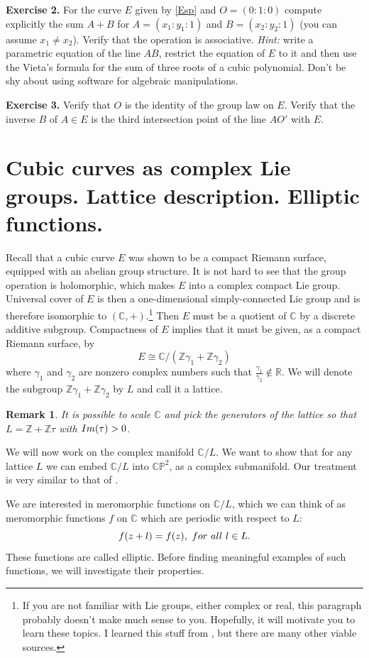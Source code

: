 \documentclass[11pt]{article}
\numberwithin{equation}{section}
\numberwithin{footnote}{section}
\newtheorem{rem}[thm]{Remark}
\newcommand{\blue}{\color{blue}}
\renewcommand{\P}{{\mathbb P}}
\newcommand{\R}{{\mathbb R}}
\newcommand{\Z}{{\mathbb Z}}
\newcommand{\C}{{\mathbb C}}
\begin{document}
{\bf Exercise 2.} For the curve $E$ given by \eqref{Esp} and $O=(0:1:0)$ compute explicitly the sum $A+B$ for $A=(x_1:y_1:1)$ and $B=(x_2:y_2:1)$ (you can assume $x_1\neq x_2$). Verify that the operation is associative.
\emph{Hint:} write a parametric equation of the line $AB$, restrict the equation of $E$ to it and then use the Vieta's formula for the sum of three roots of a cubic polynomial.  Don't be shy about using software for algebraic manipulations.

{\bf Exercise 3.} Verify that $O$ is the identity of the group law on $E$. Verify that the inverse $B$ of $A\in E$ is the third intersection point of the line $AO'$ with $E$.


\section{Cubic curves as complex Lie groups. Lattice description. Elliptic functions.}
Recall that a cubic curve $E$ was shown to be a compact Riemann surface, equipped with an abelian group structure. It is not hard to see that the group operation is holomorphic, which makes $E$ into a complex compact Lie group. Universal cover of $E$ is then a one-dimensional simply-connected Lie group and is therefore isomorphic to $(\C,+)$.\footnote{ If you are not familiar with Lie groups, either complex or real, this paragraph probably doesn't make much sense to you. Hopefully, it will motivate you to learn these topics.
I learned this stuff from \cite{VO}, but there are many other viable sources.} Then $E$ must be a quotient of $\C$ by a discrete additive subgroup. Compactness of $E$ implies that it must be given, {\blue as a compact Riemann surface}, by
$$
E\cong \C/(\Z\gamma_1 + \Z\gamma_2)
$$
where $\gamma_1$ and $\gamma_2$ are nonzero complex numbers such that $\frac {\gamma_1}{\gamma_2}\notin \R$. We will denote the subgroup $\Z \gamma_1 + \Z\gamma_2$ by $L$ and call it a {\blue lattice}.


\smallskip
\begin{rem}
It is possible to scale $\C$ and pick the generators of the lattice so that $L=\Z + \Z\tau$ with ${\rm Im}(\tau)>0$. 
\end{rem}

We will now work on the complex manifold $\C/L$. We want to show that for any lattice $L$ we can embed $\C/L$ into $\C\P^2$, as a complex submanifold. Our treatment is very similar to that of \cite{Koblitz}.

\smallskip
We are interested in meromorphic functions on $\C/L$, which we can think of as meromorphic functions $f$ on $\C$ which are periodic with respect to $L$:
$$
f(z+l)= f(z),~{\rm for~all~}l\in L.
$$
These functions are called {\blue elliptic}. Before finding meaningful examples of such functions, we will investigate their properties.
\end{document}
